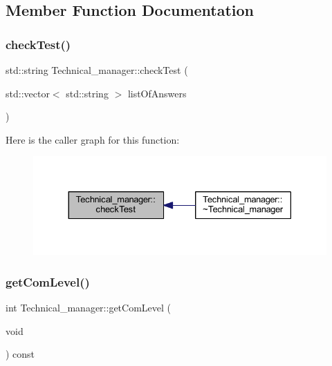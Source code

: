 \subsection{Member Function Documentation}
\hypertarget{class_technical__manager_aff72b09aef2f2b53f9bc6413242deab6}{}\label{class_technical__manager_aff72b09aef2f2b53f9bc6413242deab6} 
\subsubsection{\texorpdfstring{check\+Test()}{checkTest()}}
{\footnotesize\ttfamily std\+::string Technical\+\_\+manager\+::check\+Test (\begin{DoxyParamCaption}\item[{std\+::vector$<$ std\+::string $>$}]{list\+Of\+Answers }\end{DoxyParamCaption})}

Here is the caller graph for this function\+:
\nopagebreak
\begin{figure}[H]
\begin{center}
\leavevmode
\includegraphics[width=330pt]{class_technical__manager_aff72b09aef2f2b53f9bc6413242deab6_icgraph}
\end{center}
\end{figure}
\hypertarget{class_technical__manager_ab1f2988a3a583f1f5f4860fb2c2b6a2e}{}\label{class_technical__manager_ab1f2988a3a583f1f5f4860fb2c2b6a2e} 
\subsubsection{\texorpdfstring{get\+Com\+Level()}{getComLevel()}}
{\footnotesize\ttfamily int Technical\+\_\+manager\+::get\+Com\+Level (\begin{DoxyParamCaption}\item[{void}]{ }\end{DoxyParamCaption}) const\hspace{0.3cm}{\ttfamily [inline]}}


